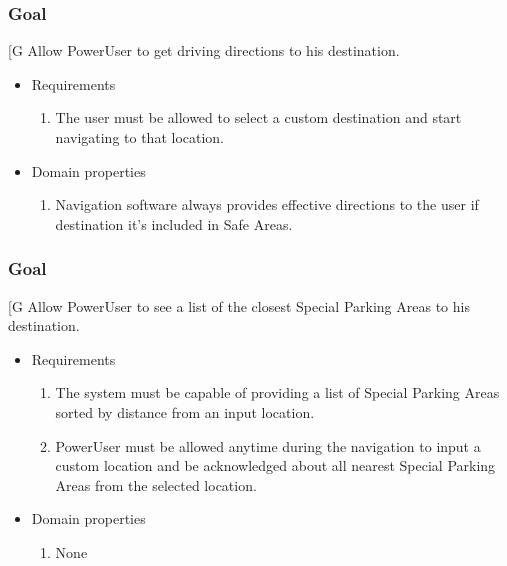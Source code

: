     \subsubsection{Goal }
    {[}G\arabic{goalctr}{]}
    Allow PowerUser to get driving directions to his destination.
    \begin{itemize}
        \item Requirements
        \begin{enumerate}[REQ]
    			\item The user must be allowed to select a custom destination and start navigating to that location.
        \end{enumerate}
        \item Domain properties
        \begin{enumerate}[PRO]
    			\item Navigation software always provides effective directions to the user if destination it's included in Safe Areas.
        \end{enumerate}
    \end{itemize}

    \subsubsection{Goal }
    {[}G\arabic{goalctr}{]}
    Allow PowerUser to see a list of the closest Special Parking Areas to his destination.
    \begin{itemize}
        \item Requirements
        \begin{enumerate}[REQ]
    		    \item The system must be capable of providing a list of Special Parking Areas sorted by distance from an input location.
			    \item PowerUser must be allowed anytime during the navigation to input a custom location and be acknowledged about all nearest Special Parking Areas from the selected location.
        \end{enumerate}
        \item Domain properties
        \begin{enumerate}[PRO]
    			\item None
        \end{enumerate}
    \end{itemize}
    

